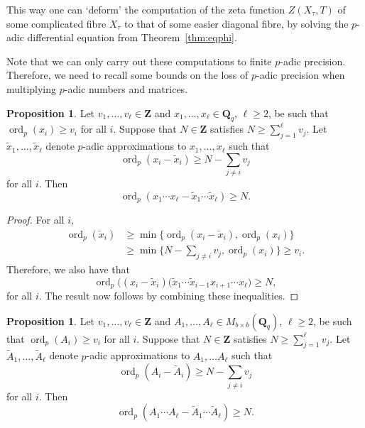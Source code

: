 \documentclass[a4paper,11pt]{article}
\numberwithin{equation}{section}
\newcommand{\ZZ}{\mathbf{Z}} %
\newcommand{\QQ}{\mathbf{Q}} %
\DeclareMathOperator{\ord}{ord}          %
\theoremstyle{definition}
\newtheorem{prop}[thm]{Proposition}
\begin{document}
This way one can `deform' the computation of the zeta function $Z(X_{\tau},T)$ 
of some complicated fibre $X_{\tau}$ to that of some easier diagonal fibre, 
by solving the $p$-adic differential equation from Theorem~\ref{thm:eqphi}.

Note that we can only carry out these computations to finite $p$-adic 
precision. Therefore, we need to recall some bounds on the loss of $p$-adic 
precision when multiplying $p$-adic numbers and matrices. 

\begin{prop} \label{prop:productval}
Let $v_1,\ldots,v_{\ell} \in \ZZ$ and $x_1, \dotsc, x_{\ell} \in \mathbf{Q}_q$,  
$\ell \geq 2$, be such that $\ord_p(x_i) \geq v_i$ for all $i$. Suppose that 
$N \in \ZZ$ satisfies $N \geq \sum_{j=1}^{\ell} v_j$. Let 
$\tilde{x}_1, \dotsc, \tilde{x}_{\ell}$ denote $p$-adic approximations to 
$x_1, \dotsc, x_{\ell}$ such that 
\[
\ord_p(x_i - \tilde{x}_i) \geq N - \sum_{j \neq i} v_j
\] 
for all $i$.  Then 
\begin{equation*}
\ord_p(x_1 \dotsm x_{\ell} - \tilde{x}_1 \dotsm \tilde{x}_{\ell}) \geq N.
\end{equation*}
\end{prop}

\begin{proof}
For all $i$,
\begin{align*}
\ord_p(\tilde{x}_i) &\geq \min \{ \ord_p(x_i-\tilde{x}_i), \ord_p(x_i) \} \\
                    &\geq \min \{ N- \sum_{j \neq i} v_j, \ord_p(x_i)\} \geq v_i.
\end{align*}
Therefore, we also have that
\begin{equation*}
\ord_p \bigl( (x_{i}-\tilde{x}_{i})
    (\tilde{x}_1 \dotsm \tilde{x}_{i-1} x_{i+1} \dotsm x_{\ell} \bigr) \geq N,
\end{equation*}
for all $i$. The result now follows by combining these inequalities.
\end{proof}

\begin{prop} \label{prop:matrixproductval}
Let $v_1,\ldots,v_{\ell} \in \ZZ$ and 
$A_1, \dotsc, A_{\ell} \in M_{b \times b}(\QQ_q)$, $\ell \geq 2$, be 
such that $\ord_p(A_i) \geq v_i$ for all $i$. Suppose that $N \in \ZZ$ 
satisfies $N \geq \sum_{j=1}^{\ell} v_j$. 
Let $\tilde{A}_1, \dotsc, \tilde{A}_{\ell}$ denote $p$-adic approximations 
to $A_1, \dotsc A_{\ell}$ such that
\[
\ord_p(A_i - \tilde{A}_i) \geq N - \sum_{j \neq i} v_j
\]
for all $i$.  Then 
\begin{equation}
\ord_p(A_1 \dotsm A_{\ell} - \tilde{A}_1 \dotsm \tilde{A}_{\ell}) \geq N.
\end{equation}
\end{prop}
\end{document}
